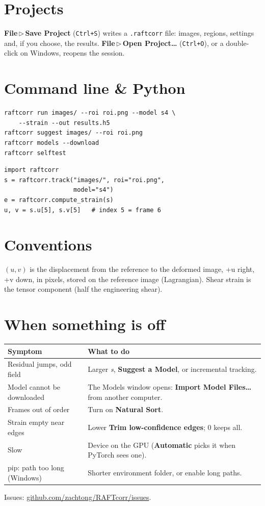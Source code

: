 \documentclass[10pt,letterpaper,twocolumn]{article}
\newcommand{\ui}[1]{\textbf{#1}}
\newcommand{\menu}[2]{\textbf{#1}\,$\triangleright$\,\textbf{#2}}
\newcommand{\file}[1]{\texttt{#1}}
\begin{document}
\section{Projects}
\menu{File}{Save Project} (\texttt{Ctrl+S}) writes a \file{.raftcorr} file: images, regions,
settings and, if you choose, the results. \menu{File}{Open Project…} (\texttt{Ctrl+O}), or a
double-click on Windows, reopens the session.

\section{Command line \& Python}
{\small
\begin{verbatim}
raftcorr run images/ --roi roi.png --model s4 \
    --strain --out results.h5
raftcorr suggest images/ --roi roi.png
raftcorr models --download
raftcorr selftest
\end{verbatim}
\begin{verbatim}
import raftcorr
s = raftcorr.track("images/", roi="roi.png",
                   model="s4")
e = raftcorr.compute_strain(s)
u, v = s.u[5], s.v[5]   # index 5 = frame 6
\end{verbatim}
}

\section{Conventions}
\((u, v)\) is the displacement from the reference to the deformed image, +u right, +v down, in
pixels, stored on the reference image (Lagrangian). Shear strain is the tensor component (half the
engineering shear).

\section{When something is off}
\begin{center}\small
\begin{tabularx}{\columnwidth}{@{}>{\raggedright\arraybackslash}p{}X@{}}
\toprule
Symptom & What to do \\
\midrule
Residual jumps, odd field & Larger \emph{s}, \ui{Suggest a Model}, or incremental tracking. \\
Model cannot be downloaded & The Models window opens: \ui{Import Model Files…} from another computer. \\
Frames out of order & Turn on \ui{Natural Sort}. \\
Strain empty near edges & Lower \ui{Trim low-confidence edges}; 0 keeps all. \\
Slow & Device on the GPU (\ui{Automatic} picks it when PyTorch sees one). \\
pip: path too long (Windows) & Shorter environment folder, or enable long paths. \\
\bottomrule
\end{tabularx}
\end{center}
Issues: \href{https://github.com/zachtong/RAFTcorr/issues}{github.com/zachtong/RAFTcorr/issues}.
\end{document}
